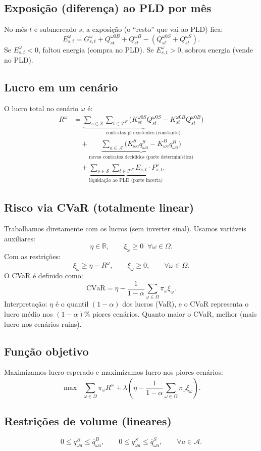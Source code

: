 \documentclass{article}
\begin{document}
\subsection{Exposição (diferença) ao PLD por mês}
No mês $t$ e submercado $s$, a exposição (o ``resto'' que vai ao PLD) fica:
\[
E^{\omega}_{s,t} =
G^{\omega}_{s,t} + Q^{\omega 0 B}_{s t} + Q^{\omega B}_{s t}
-
\left(Q^{\omega 0 S}_{s t} + Q^{\omega S}_{s t}\right).
\]
Se $E^{\omega}_{s,t}<0$, faltou energia (compra no PLD). Se $E^{\omega}_{s,t}>0$, sobrou energia (vende no PLD).

\subsection{Lucro em um cenário}
O lucro total no cenário $\omega$ é:
\begin{align}
R^\omega
&=
\underbrace{
\sum_{s\in\mathcal{S}}\sum_{t\in\mathcal{T}^{F}}
\Big(K^{\omega 0 S}_{s t}Q^{\omega 0 S}_{s t} - K^{\omega 0 B}_{s t}Q^{\omega 0 B}_{s t}\Big)
}_{\text{contratos já existentes (constante)}}
\\[2mm]
&\quad+
\underbrace{
\sum_{a\in\mathcal{A}}\Big(K_{\omega a}^{S} q_{\omega a}^{S} - K_{\omega a}^{B} q_{\omega a}^{B}\Big)
}_{\text{novos contratos decididos (parte determinística)}}
\\[2mm]
&\quad+
\underbrace{
\sum_{s\in\mathcal{S}}\sum_{t\in\mathcal{T}^{F}}
E_{s,t}\cdot P^\omega_{s,t}
}_{\text{liquidação ao PLD (parte incerta)}}
.
\end{align}

\subsection{Risco via CVaR (totalmente linear)}
Trabalhamos diretamente com os lucros (sem inverter sinal).
Usamos variáveis auxiliares:
\[
\eta \in \mathbb{R},
\qquad
\xi_\omega \ge 0 \;\;\forall \omega\in\Omega.
\]
Com as restrições:
\[
\xi_\omega \ge \eta - R^\omega,
\qquad
\xi_\omega \ge 0,
\qquad \forall \omega\in\Omega.
\]
O CVaR é definido como:
\[
\text{CVaR} = \eta - \frac{1}{1-\alpha}\sum_{\omega\in\Omega}\pi_\omega \xi_\omega.
\]
Interpretação: $\eta$ é o quantil $(1-\alpha)$ dos lucros (VaR), e o CVaR representa o lucro médio nos $(1-\alpha)\%$ piores cenários. Quanto maior o CVaR, melhor (mais lucro nos cenários ruins).

\subsection{Função objetivo}
Maximizamos lucro esperado e maximizamos lucro nos piores cenários:
\[
\max \;\;
\sum_{\omega\in\Omega}\pi_\omega R^\omega
+
\lambda\left(
\eta - \frac{1}{1-\alpha}\sum_{\omega\in\Omega}\pi_\omega \xi_\omega
\right).
\]

\subsection{Restrições de volume (lineares)}
\[
0 \le q_{\omega a}^{B} \le \overline{q}_{\omega a}^{B},
\qquad
0 \le q_{\omega a}^{S} \le \overline{q}_{\omega a}^{S},
\qquad \forall a\in\mathcal{A}.
\]
\end{document}
